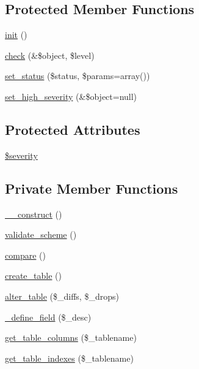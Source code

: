 \subsection*{Protected Member Functions}
\begin{DoxyCompactItemize}
\item 
\hyperlink{class__OWL_ae0ef3ded56e8a6b34b6461e5a721cd3e}{init} ()
\item 
\hyperlink{class__OWL_ad6f4f6946f40199dd0333cf219fa500e}{check} (\&\$object, \$level)
\item 
\hyperlink{class__OWL_aea912d0ede9b3c2a69b79072d94d4787}{set\_\-status} (\$status, \$params=array())
\item 
\hyperlink{class__OWL_a576829692a3b66e3d518853bf43abae3}{set\_\-high\_\-severity} (\&\$object=null)
\end{DoxyCompactItemize}
\subsection*{Protected Attributes}
\begin{DoxyCompactItemize}
\item 
\hyperlink{class__OWL_ad26b40a9dbbacb33e299b17826f8327c}{\$severity}
\end{DoxyCompactItemize}
\subsection*{Private Member Functions}
\begin{DoxyCompactItemize}
\item 
\hyperlink{classSchemeHandler_ae528fde31fe73647c614ef6f957c4caf}{\_\-\_\-construct} ()
\item 
\hyperlink{classSchemeHandler_a1d92dea6ea4643959609959bdce6f0d1}{validate\_\-scheme} ()
\item 
\hyperlink{classSchemeHandler_ae2a981feae465ef5e46782b4a18da1ad}{compare} ()
\item 
\hyperlink{classSchemeHandler_a87f623cc6ac1e44576d2415e36804218}{create\_\-table} ()
\item 
\hyperlink{classSchemeHandler_a7652ae28d0407f5be24fd67ad1b79e8d}{alter\_\-table} (\$\_\-diffs, \$\_\-drops)
\item 
\hyperlink{classSchemeHandler_a223d509509598fbc99741e910bda8cac}{\_\-define\_\-field} (\$\_\-desc)
\item 
\hyperlink{classSchemeHandler_ab8f222514c3aa614190201a6a8a9cedd}{get\_\-table\_\-columns} (\$\_\-tablename)
\item 
\hyperlink{classSchemeHandler_a23070e6253bcd9b0bc343bc582219638}{get\_\-table\_\-indexes} (\$\_\-tablename)
\end{DoxyCompactItemize}
